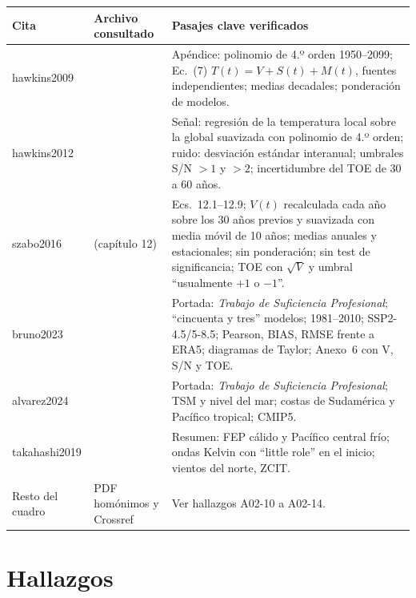 \begin{center}\small
\begin{tabular}{@{}L{2.6cm}L{4.2cm}L{\dimexpr\textwidth-6.8cm-4\tabcolsep\relax}@{}}
\toprule
Cita & Archivo consultado & Pasajes clave verificados \\
\midrule
hawkins2009 &  & Apéndice: polinomio de 4.º orden 1950--2099; Ec.~(7) $T(t)=V+S(t)+M(t)$, fuentes independientes; medias decadales; ponderación de modelos. \\
hawkins2012 &  & Señal: regresión de la temperatura local sobre la global suavizada con polinomio de 4.º orden; ruido: desviación estándar interanual; umbrales S/N $>1$ y $>2$; incertidumbre del TOE de 30 a 60 años. \\
szabo2016 &  (capítulo 12) & Ecs.~12.1--12.9; $V(t)$ recalculada cada año sobre los 30 años previos y suavizada con media móvil de 10 años; medias anuales y estacionales; sin ponderación; sin test de significancia; TOE con $\sqrt{V}$ y umbral ``usualmente $+1$ o $-1$''. \\
bruno2023 &  & Portada: \emph{Trabajo de Suficiencia Profesional}; ``cincuenta y tres'' modelos; 1981--2010; SSP2-4.5/5-8.5; Pearson, BIAS, RMSE frente a ERA5; diagramas de Taylor; Anexo~6 con V, S/N y TOE. \\
alvarez2024 &  & Portada: \emph{Trabajo de Suficiencia Profesional}; TSM y nivel del mar; costas de Sudamérica y Pacífico tropical; CMIP5. \\
takahashi2019 &  & Resumen: FEP cálido y Pacífico central frío; ondas Kelvin con ``little role'' en el inicio; vientos del norte, ZCIT. \\
Resto del cuadro & PDF homónimos y Crossref & Ver hallazgos A02-10 a A02-14. \\
\bottomrule
\end{tabular}
\end{center}

\section{Hallazgos}

